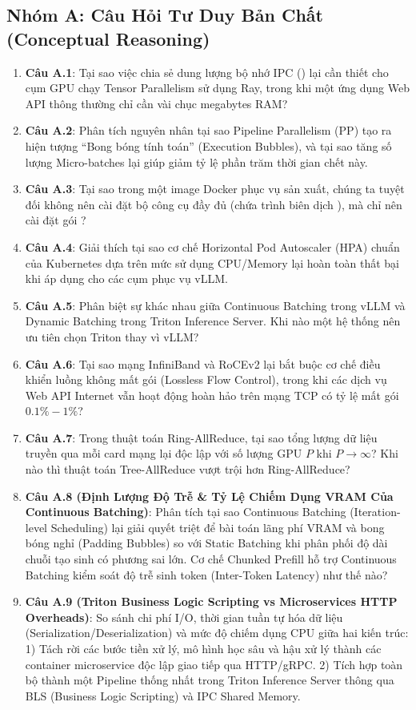 \subsection{Nhóm A: Câu Hỏi Tư Duy Bản Chất (Conceptual Reasoning)}
\begin{enumerate}
  \item \textbf{Câu A.1}: Tại sao việc chia sẻ dung lượng bộ nhớ IPC () lại cần thiết cho cụm GPU chạy Tensor Parallelism sử dụng Ray, trong khi một ứng dụng Web API thông thường chỉ cần vài chục megabytes RAM?
  \item \textbf{Câu A.2}: Phân tích nguyên nhân tại sao Pipeline Parallelism (PP) tạo ra hiện tượng ``Bong bóng tính toán'' (Execution Bubbles), và tại sao tăng số lượng Micro-batches lại giúp giảm tỷ lệ phần trăm thời gian chết này.
  \item \textbf{Câu A.3}: Tại sao trong một image Docker phục vụ sản xuất, chúng ta tuyệt đối không nên cài đặt bộ công cụ đầy đủ  (chứa trình biên dịch ), mà chỉ nên cài đặt gói ?
  \item \textbf{Câu A.4}: Giải thích tại sao cơ chế Horizontal Pod Autoscaler (HPA) chuẩn của Kubernetes dựa trên mức sử dụng CPU/Memory lại hoàn toàn thất bại khi áp dụng cho các cụm phục vụ vLLM.
  \item \textbf{Câu A.5}: Phân biệt sự khác nhau giữa Continuous Batching trong vLLM và Dynamic Batching trong Triton Inference Server. Khi nào một hệ thống nên ưu tiên chọn Triton thay vì vLLM?
  \item \textbf{Câu A.6}: Tại sao mạng InfiniBand và RoCEv2 lại bắt buộc cơ chế điều khiển luồng không mất gói (Lossless Flow Control), trong khi các dịch vụ Web API Internet vẫn hoạt động hoàn hảo trên mạng TCP có tỷ lệ mất gói $0.1\%-1\%$?
  \item \textbf{Câu A.7}: Trong thuật toán Ring-AllReduce, tại sao tổng lượng dữ liệu truyền qua mỗi card mạng lại độc lập với số lượng GPU $P$ khi $P \to \infty$? Khi nào thì thuật toán Tree-AllReduce vượt trội hơn Ring-AllReduce?
  \item \textbf{Câu A.8 (Định Lượng Độ Trễ \& Tỷ Lệ Chiếm Dụng VRAM Của Continuous Batching)}: Phân tích tại sao Continuous Batching (Iteration-level Scheduling) lại giải quyết triệt để bài toán lãng phí VRAM và bong bóng nghỉ (Padding Bubbles) so với Static Batching khi phân phối độ dài chuỗi tạo sinh có phương sai lớn. Cơ chế Chunked Prefill hỗ trợ Continuous Batching kiểm soát độ trễ sinh token (Inter-Token Latency) như thế nào?
  \item \textbf{Câu A.9 (Triton Business Logic Scripting vs Microservices HTTP Overheads)}: So sánh chi phí I/O, thời gian tuần tự hóa dữ liệu (Serialization/Deserialization) và mức độ chiếm dụng CPU giữa hai kiến trúc:
  1) Tách rời các bước tiền xử lý, mô hình học sâu và hậu xử lý thành các container microservice độc lập giao tiếp qua HTTP/gRPC.
  2) Tích hợp toàn bộ thành một Pipeline thống nhất trong Triton Inference Server thông qua BLS (Business Logic Scripting) và IPC Shared Memory.
\end{enumerate}


